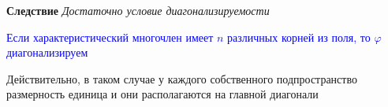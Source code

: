      \textbf{Следствие} \textit{Достаточно условие диагонализируемости}

    \textcolor{blue}{Если характеристический многочлен имеет $n$ различных корней из поля, то $\varphi$
        диагонализируем}

    Действительно, в таком случае у каждого собственного подпространство размерность единица и они располагаются на
    главной диагонали

%
%
